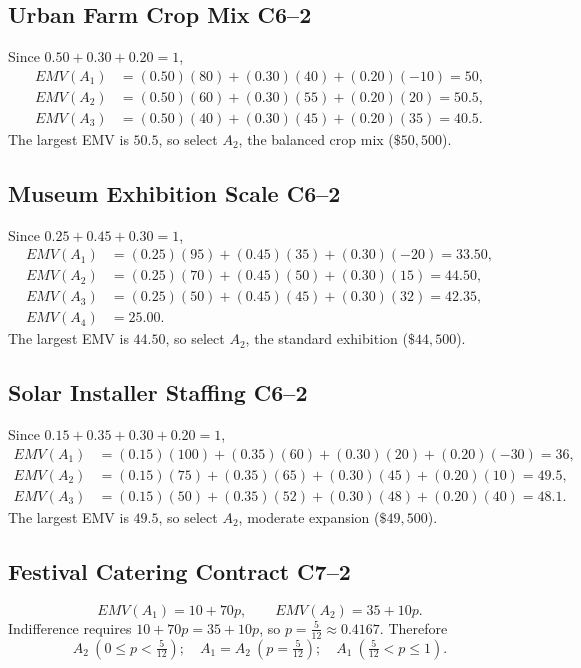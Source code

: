 \subsection{Urban Farm Crop Mix \hfill C6--2}
Since $0.50+0.30+0.20=1$,
\begin{align*}
EMV(A_1)&=(0.50)(80)+(0.30)(40)+(0.20)(-10)=50,\\
EMV(A_2)&=(0.50)(60)+(0.30)(55)+(0.20)(20)=50.5,\\
EMV(A_3)&=(0.50)(40)+(0.30)(45)+(0.20)(35)=40.5.
\end{align*}
The largest EMV is $50.5$, so select $\boxed{A_2}$, the balanced crop mix ($\$50{,}500$).

\subsection{Museum Exhibition Scale \hfill C6--2}
Since $0.25+0.45+0.30=1$,
\begin{align*}
EMV(A_1)&=(0.25)(95)+(0.45)(35)+(0.30)(-20)=33.50,\\
EMV(A_2)&=(0.25)(70)+(0.45)(50)+(0.30)(15)=44.50,\\
EMV(A_3)&=(0.25)(50)+(0.45)(45)+(0.30)(32)=42.35,\\
EMV(A_4)&=25.00.
\end{align*}
The largest EMV is $44.50$, so select $\boxed{A_2}$, the standard exhibition ($\$44{,}500$).

\subsection{Solar Installer Staffing \hfill C6--2}
Since $0.15+0.35+0.30+0.20=1$,
\begin{align*}
EMV(A_1)&=(0.15)(100)+(0.35)(60)+(0.30)(20)+(0.20)(-30)=36,\\
EMV(A_2)&=(0.15)(75)+(0.35)(65)+(0.30)(45)+(0.20)(10)=49.5,\\
EMV(A_3)&=(0.15)(50)+(0.35)(52)+(0.30)(48)+(0.20)(40)=48.1.
\end{align*}
The largest EMV is $49.5$, so select $\boxed{A_2}$, moderate expansion ($\$49{,}500$).

\subsection{Festival Catering Contract \hfill C7--2}
\[
EMV(A_1)=10+70p,\qquad EMV(A_2)=35+10p.
\]
Indifference requires $10+70p=35+10p$, so $p=\frac{5}{12}\approx0.4167$. Therefore
\[
\boxed{A_2\ (0\le p<\tfrac{5}{12});\quad A_1=A_2\ (p=\tfrac{5}{12});\quad A_1\ (\tfrac{5}{12}<p\le1).}
\]

